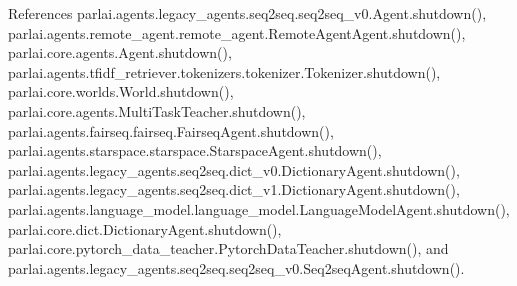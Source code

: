 References parlai.\+agents.\+legacy\+\_\+agents.\+seq2seq.\+seq2seq\+\_\+v0.\+Agent.\+shutdown(), parlai.\+agents.\+remote\+\_\+agent.\+remote\+\_\+agent.\+Remote\+Agent\+Agent.\+shutdown(), parlai.\+core.\+agents.\+Agent.\+shutdown(), parlai.\+agents.\+tfidf\+\_\+retriever.\+tokenizers.\+tokenizer.\+Tokenizer.\+shutdown(), parlai.\+core.\+worlds.\+World.\+shutdown(), parlai.\+core.\+agents.\+Multi\+Task\+Teacher.\+shutdown(), parlai.\+agents.\+fairseq.\+fairseq.\+Fairseq\+Agent.\+shutdown(), parlai.\+agents.\+starspace.\+starspace.\+Starspace\+Agent.\+shutdown(), parlai.\+agents.\+legacy\+\_\+agents.\+seq2seq.\+dict\+\_\+v0.\+Dictionary\+Agent.\+shutdown(), parlai.\+agents.\+legacy\+\_\+agents.\+seq2seq.\+dict\+\_\+v1.\+Dictionary\+Agent.\+shutdown(), parlai.\+agents.\+language\+\_\+model.\+language\+\_\+model.\+Language\+Model\+Agent.\+shutdown(), parlai.\+core.\+dict.\+Dictionary\+Agent.\+shutdown(), parlai.\+core.\+pytorch\+\_\+data\+\_\+teacher.\+Pytorch\+Data\+Teacher.\+shutdown(), and parlai.\+agents.\+legacy\+\_\+agents.\+seq2seq.\+seq2seq\+\_\+v0.\+Seq2seq\+Agent.\+shutdown().

